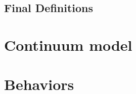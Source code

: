 \documentclass{article}
\begin{document}
\subsection{Final Definitions}

\section{Continuum model}

\section{Behaviors}


\end{document}
